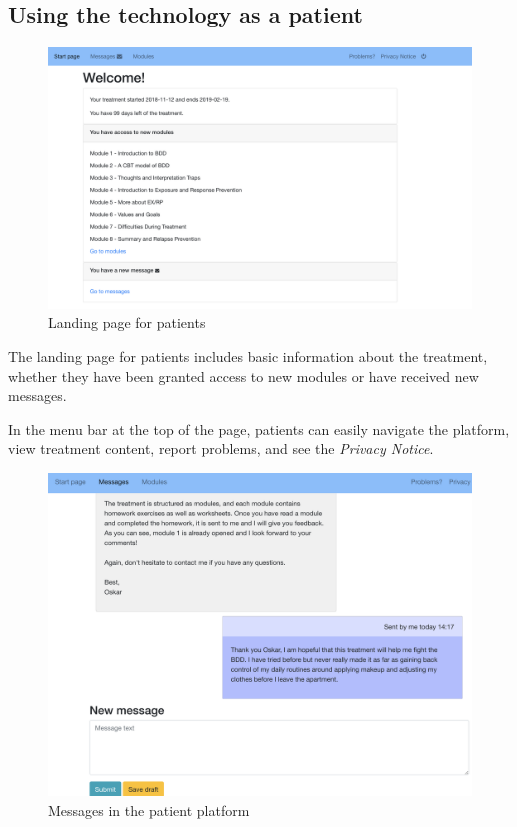 \documentclass[]{book}
\begin{document}
\hypertarget{using-the-technology-as-a-patient}{%
\subsection{Using the technology as a patient}\label{using-the-technology-as-a-patient}}

\begin{figure}
\centering
\includegraphics{images/patient-overview.png}
\caption{Landing page for patients}
\end{figure}

The landing page for patients includes basic information about the treatment, whether they have been granted access to new modules or have received new messages.

In the menu bar at the top of the page, patients can easily navigate the platform, view treatment content, report problems, and see the \emph{Privacy Notice}.

\begin{figure}
\centering
\includegraphics{images/patient-messages.png}
\caption{Messages in the patient platform}
\end{figure}
\end{document}
